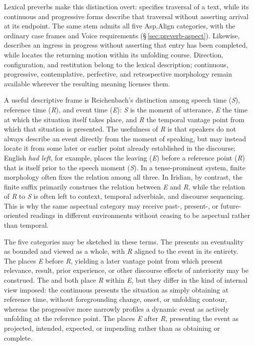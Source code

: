 Lexical preverbs make this distinction overt:   specifies traversal of a text, while its continuous and progressive
forms describe that traversal without asserting arrival at its endpoint.
The same stem admits all five Asp.Align categories, with the ordinary case
frames and Voice requirements (§\,\ref{sec:preverb-aspect}). Likewise,
  describes an ingress
in progress without asserting that entry has been completed, while
  locates the returning motion
within its unfolding course. Direction, configuration, and restitution belong
to the lexical description; continuous, progressive, contemplative, perfective,
and retrospective morphology remain available wherever the resulting meaning
licenses them.

A useful descriptive frame is Reichenbach's distinction among speech time
(\textit{S}), reference time (\textit{R}), and event time (\textit{E}):
\textit{S} is the moment of utterance, \textit{E} the time at which the
situation itself takes place, and \textit{R} the temporal vantage point from
which that situation is presented. The usefulness of \textit{R} is that speakers
do not always describe an event directly from the moment of speaking, but may
instead locate it from some later or earlier point already established in the
discourse; English \textit{had left}, for example, places the leaving
(\textit{E}) before a reference point (\textit{R}) that is itself prior to the
speech moment (\textit{S}). In a tense-prominent system, finite morphology often
fixes the relation among all three. In Iridian, by contrast, the finite suffix
primarily construes the relation between \textit{E} and \textit{R}, while the
relation of \textit{R} to \textit{S} is often left to context, temporal
adverbials, and discourse sequencing. This is why the same aspectual category
may receive past-, present-, or future-oriented readings in different
environments without ceasing to be aspectual rather than temporal.

The five categories may be sketched in these terms. The 
presents an eventuality as bounded and viewed as a whole, with \textit{R}
aligned to the event in its entirety. The  places \textit{E}
before \textit{R}, yielding a later vantage point from which present relevance,
result, prior experience, or other discourse effects of anteriority may be
construed. The  and  both place \textit{R}
within \textit{E}, but they differ in the kind of internal view imposed: the
continuous presents the situation as simply obtaining at reference time, without
foregrounding change, onset, or unfolding contour, whereas the progressive more
narrowly profiles a dynamic event as actively unfolding at the reference point.
The  places \textit{E} after \textit{R}, presenting the
event as projected, intended, expected, or impending rather than as obtaining or
complete.

